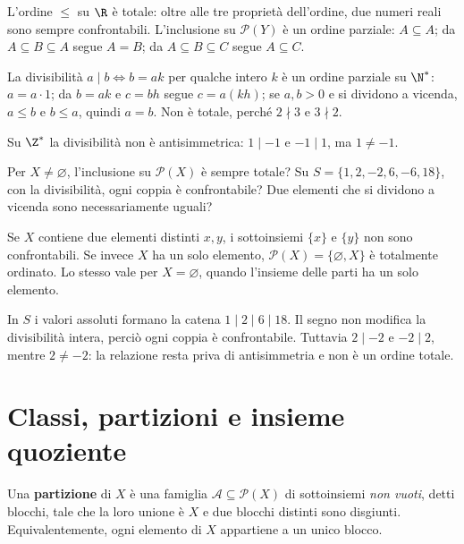 \begin{esempio}
L'ordine $\le$ su $\R$ è totale: oltre alle tre proprietà dell'ordine, due numeri reali sono sempre confrontabili. L'inclusione su $\mathcal P(Y)$ è un ordine parziale: $A\subseteq A$; da $A\subseteq B\subseteq A$ segue $A=B$; da $A\subseteq B\subseteq C$ segue $A\subseteq C$.

La divisibilità $a\mid b\iff b=ak$ per qualche intero $k$ è un ordine parziale su $\N^*$: $a=a\cdot1$; da $b=ak$ e $c=bh$ segue $c=a(kh)$; se $a,b>0$ e si dividono a vicenda, $a\le b$ e $b\le a$, quindi $a=b$. Non è totale, perché $2\nmid3$ e $3\nmid2$.

Su $\Z^*$ la divisibilità non è antisimmetrica: $1\mid-1$ e $-1\mid1$, ma $1\ne-1$.
\end{esempio}

\begin{esercizio}
Per $X\ne\varnothing$, l'inclusione su $\mathcal P(X)$ è sempre totale? Su $S=\{1,2,-2,6,-6,18\}$, con la divisibilità, ogni coppia è confrontabile? Due elementi che si dividono a vicenda sono necessariamente uguali?
\end{esercizio}
\begin{svolgimento}
Se $X$ contiene due elementi distinti $x,y$, i sottoinsiemi $\{x\}$ e $\{y\}$ non sono confrontabili. Se invece $X$ ha un solo elemento, $\mathcal P(X)=\{\varnothing,X\}$ è totalmente ordinato. Lo stesso vale per $X=\varnothing$, quando l'insieme delle parti ha un solo elemento.

In $S$ i valori assoluti formano la catena $1\mid2\mid6\mid18$. Il segno non modifica la divisibilità intera, perciò ogni coppia è confrontabile. Tuttavia $2\mid-2$ e $-2\mid2$, mentre $2\ne-2$: la relazione resta priva di antisimmetria e non è un ordine totale.
\end{svolgimento}

\section{Classi, partizioni e insieme quoziente}
\begin{definizione}
Una \textbf{partizione} di $X$ è una famiglia $\mathcal A\subseteq\mathcal P(X)$ di sottoinsiemi \emph{non vuoti}, detti blocchi, tale che la loro unione è $X$ e due blocchi distinti sono disgiunti. Equivalentemente, ogni elemento di $X$ appartiene a un unico blocco.
\end{definizione}


